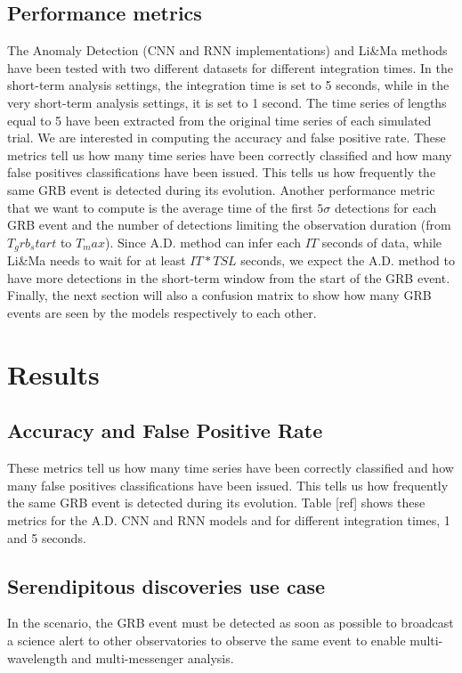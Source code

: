 \subsection{Performance metrics}
\label{s:Peformance-Metrics}
The Anomaly Detection (CNN and RNN implementations) and Li\&Ma methods have been tested with two different datasets for different integration times. In the short-term analysis settings, the integration time is set to 5 seconds, while in the very short-term analysis settings, it is set to 1 second. The time series of lengths equal to 5 have been extracted from the original time series of each simulated trial. We are interested in computing the accuracy and false positive rate. These metrics tell us how many time series have been correctly classified and how many false positives classifications have been issued. This tells us how frequently the same GRB event is detected during its evolution. Another performance metric that we want to compute is the average time of the first $5\sigma$ detections for each GRB event and the number of detections limiting the observation duration (from $T_grb_start$ to $T_max$). Since A.D. method can infer each $IT$ seconds of data, while Li\&Ma needs to wait for at least $IT*TSL$ seconds, we expect the A.D. method to have more detections in the short-term window from the start of the GRB event. Finally, the next section will also a confusion matrix to show how many GRB events are seen by the models respectively to each other. 


\section{Results}
\label{s:Experiment-Results}

\subsection{Accuracy and False Positive Rate}
\label{s:Acc-Fpr}
These metrics tell us how many time series have been correctly classified and how many false positives classifications have been issued. This tells us how frequently the same GRB event is detected during its evolution.
Table [ref] shows these metrics for the A.D. CNN and RNN models and for different integration times, 1 and 5 seconds.

\subsection{Serendipitous discoveries use case}
\label{s:Serendipitous-Discoveries-Results}
In the scenario, the GRB event must be detected as soon as possible to broadcast a science alert to other observatories to observe the same event to enable multi-wavelength and multi-messenger analysis. 

